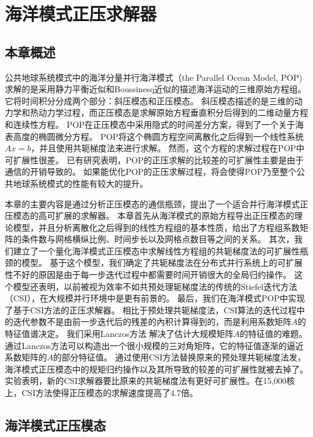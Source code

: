 \chapter{海洋模式正压求解器}
\label{cha:barosSolver}

\section{本章概述}

公共地球系统模式中的海洋分量并行海洋模式（the Parallel Ocean Model, POP) 求解的是采用静力平衡近似和Boussinesq近似的描述海洋运动的三维原始方程组。 
它将时间积分分成两个部分：斜压模态和正压模态。 
斜压模态描述的是三维的动力学和热动力学过程，而正压模态是求解原始方程垂直积分后得到的二维动量方程和连续性方程。
POP在正压模态中采用隐式的时间差分方案，得到了一个关于海表高度的椭圆微分方程。 
POP将这个椭圆方程空间离散化之后得到一个线性系统$Ax=b$，并且使用共轭梯度法来进行求解。
然而，这个方程的求解过程在POP中可扩展性很差。
已有研究表明，POP的正压求解的比较差的可扩展性主要是由于通信的开销导致的\cite{Worley:2011:PCE:2063384.2063457}。 
如果能优化POP的正压求解过程，将会使得POP乃至整个公共地球系统模式的性能有较大的提升\cite{dennis2012computational}。 


本章的主要内容是通过分析正压模态的通信瓶颈，提出了一个适合并行海洋模式正压模态的高可扩展的求解器。 
本章首先从海洋模式的原始方程导出正压模态的理论模型，并且分析离散化之后得到的线性方程组的基本性质，给出了方程组系数矩阵的条件数与网格横纵比例、时间步长以及网格点数目等之间的关系。 
其次，我们建立了一个量化海洋模式正压模态中求解线性方程组的共轭梯度法的可扩展性瓶颈的模型。
基于这个模型，我们确定了共轭梯度法在分布式并行系统上的可扩展性不好的原因是由于每一步迭代过程中都需要时间开销很大的全局归约操作。 这个模型还表明，以前被视为效率不如共预处理轭梯度法的传统的Stiefel迭代方法（CSI），在大规模并行环境中是更有前景的。
最后，我们在海洋模式POP中实现了基于CSI方法的正压求解器。 相比于预处理共轭梯度法，CSI算法的迭代过程中的迭代参数不是由前一步迭代后的残差的內积计算得到的，而是利用系数矩阵$A$的特征值谱决定。 
我们采用Lanczos方法 解决了估计大规模矩阵$A$的特征值的难题。 
通过Lanczos方法可以构造出一个很小规模的三对角矩阵，它的特征值逐渐的逼近系数矩阵的$A$的部分特征值。 
通过使用CSI方法替换原来的预处理共轭梯度法发， 海洋模式正压模态中的规矩归约操作以及其所导致的较差的可扩展性就被去掉了。 
实验表明，新的CSI求解器要比原来的共轭梯度法有更好可扩展性。在15,000核上，CSI方法使得正压模态的求解速度提高了4.7倍。





\section{海洋模式正压模态}
\label{solver:baro}

